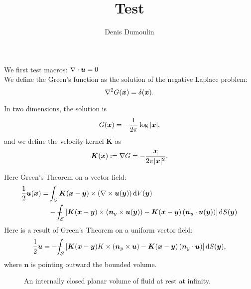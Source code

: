 \documentclass[11pt]{extarticle}
\title{Test}
\author{Denis Dumoulin}
\begin{document}
\maketitle
We first test macros: $\nabla \cdot \bm{u} = 0$\\

We define the Green's function as the solution of the
negative Laplace problem:
\begin{equation}
  \nabla^2 G(\bm{x}) = \delta(\bm{x}).
\end{equation}

In two dimensions, the solution is
\begin{equation}
  G(\bm{x}) = -\frac{1}{2\pi} \log{|\bm{x}|},
\end{equation}
and we define the velocity kernel $\bm{K}$ as
\begin{equation}
  \bm{K}(\bm{x}) := \nabla G = -\frac{\bm{x}}{2\pi|\bm{x}|^2}.
\end{equation}

Here Green's Theorem on a vector field:
\begin{align}
  \frac{1}{2} \bu(\bx)= &\int_\mathcal{V}\kernel \times \left(\rotux{y}\right) \mathrm{d} V(\by)\\
                          &-\dashint_{\mathcal{S}}\left[\kernel\times\left(\bn_y \times \bu(\by)\right)
                          -\kernel\left(\bn_y \cdot \bu(\by)\right)\right] \mathrm{d} S(\by)
\end{align}
Here is a result of Green's Theorem on a uniform vector field:
\begin{align} \frac{1}{2} \bu=-\dashint_{\mathcal{S}}\left[\kernel{K} \times\left(\bn_y \times \bu\right)
-\kernel\left(\bn_y \cdot \bu\right)\right] \mathrm{d} S(\by),
\end{align}
where $\boldsymbol{n}$ is pointing outward the bounded volume.
\begin{figure}[!h]
  \centering
  
  \caption{An internally closed planar volume of fluid at rest at infinity.}
\end{figure}
\end{document}
